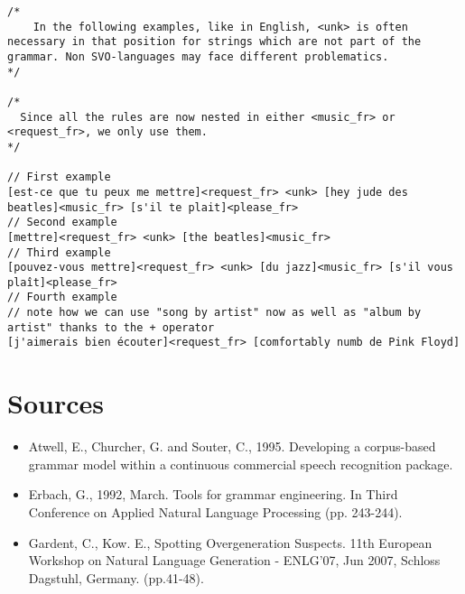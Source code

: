 \documentclass[12pt, a4paper]{article}
\begin{document}
\begin{lstlisting}
/*
    In the following examples, like in English, <unk> is often necessary in that position for strings which are not part of the grammar. Non SVO-languages may face different problematics.
*/

/*
  Since all the rules are now nested in either <music_fr> or <request_fr>, we only use them.
*/

// First example
[est-ce que tu peux me mettre]<request_fr> <unk> [hey jude des beatles]<music_fr> [s'il te plait]<please_fr>
// Second example
[mettre]<request_fr> <unk> [the beatles]<music_fr>
// Third example
[pouvez-vous mettre]<request_fr> <unk> [du jazz]<music_fr> [s'il vous plaît]<please_fr>
// Fourth example
// note how we can use "song by artist" now as well as "album by artist" thanks to the + operator
[j'aimerais bien écouter]<request_fr> [comfortably numb de Pink Floyd]
\end{lstlisting}

\section{Sources}

\begin{itemize}
    \item Atwell, E., Churcher, G. and Souter, C., 1995. Developing a corpus-based grammar model within a continuous commercial speech recognition package.
    \item Erbach, G., 1992, March. Tools for grammar engineering. In Third Conference on Applied Natural Language Processing (pp. 243-244).
  \item Gardent, C., Kow. E., Spotting Overgeneration Suspects. 11th European Workshop on Natural
Language Generation - ENLG’07, Jun 2007, Schloss Dagstuhl, Germany. (pp.41-48).
 
\end{itemize}
\end{document}
